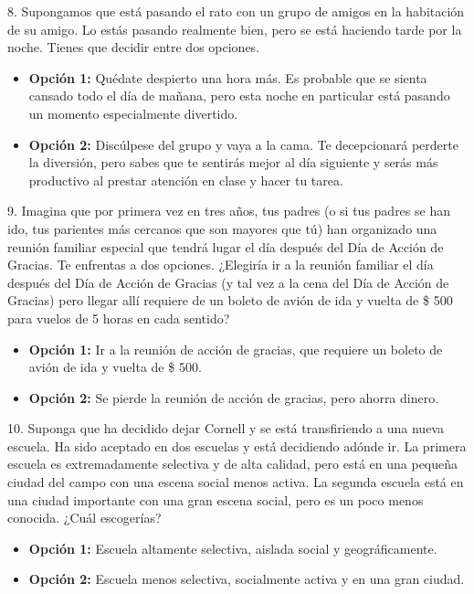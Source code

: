 \documentclass[12pt,spanish]{article}
\begin{document}
8. Supongamos que está pasando el rato con un grupo de amigos en la habitación de su amigo. Lo estás pasando realmente bien, pero se está haciendo tarde por la noche. Tienes que decidir entre dos opciones.
\begin{itemize}
    \item \textbf{Opción 1:} Quédate despierto una hora más. Es probable que se sienta cansado todo el día de mañana, pero esta noche en particular está pasando un momento especialmente divertido.
    \item \textbf{Opción 2:} Discúlpese del grupo y vaya a la cama. Te decepcionará perderte la diversión, pero sabes que te sentirás mejor al día siguiente y serás más productivo al prestar atención en clase y hacer tu tarea.
\end{itemize}

9. Imagina que por primera vez en tres años, tus padres (o si tus padres se han ido, tus parientes más cercanos que son mayores que tú) han organizado una reunión familiar especial que tendrá lugar el día después del Día de Acción de Gracias. Te enfrentas a dos opciones. ¿Elegiría ir a la reunión familiar el día después del Día de Acción de Gracias (y tal vez a la cena del Día de Acción de Gracias) pero llegar allí requiere de un boleto de avión de ida y vuelta de \$ 500 para vuelos de 5 horas en cada sentido?
\begin{itemize}
    \item \textbf{Opción 1:} Ir a la reunión de acción de gracias, que requiere un boleto de avión de ida y vuelta de \$ 500.
    \item \textbf{Opción 2:} Se pierde la reunión de acción de gracias, pero ahorra dinero.
\end{itemize}

10. Suponga que ha decidido dejar Cornell y se está transfiriendo a una nueva escuela. Ha sido aceptado en dos escuelas y está decidiendo adónde ir. La primera escuela es extremadamente selectiva y de alta calidad, pero está en una pequeña ciudad del campo con una escena social menos activa. La segunda escuela está en una ciudad importante con una gran escena social, pero es un poco menos conocida. ¿Cuál escogerías?
\begin{itemize}
    \item \textbf{Opción 1:} Escuela altamente selectiva, aislada social y geográficamente.
    \item \textbf{Opción 2:} Escuela menos selectiva, socialmente activa y en una gran ciudad.
\end{itemize}
\end{document}
